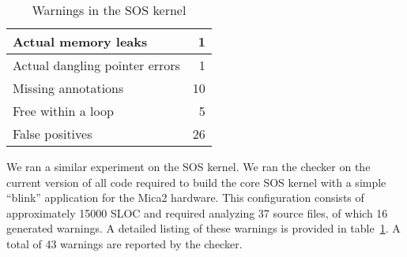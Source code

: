 \begin{table}
\caption{Warnings in the SOS kernel}
%
\label{tab:kernel}
\centering 
\begin{tabular}{| l | r |}
    \hline 
    Actual memory leaks & 1 \\
    \hline 
    Actual dangling pointer errors & 1 \\
    \hline
    Missing annotations & 10 \\
    \hline 
    Free within a loop & 5 \\
    \hline 
    False positives & 26 \\
    \hline 
\end{tabular} 
%
\end{table}

We ran a similar experiment on the SOS kernel.
We ran the checker on the current version of all code required to
build the core SOS kernel with a simple ``blink'' application for the
Mica2 hardware.  This configuration consists of approximately 15000 SLOC and
required analyzing 37 source files, of which 16
generated warnings.
A detailed listing of these warnings is
provided in table~\ref{tab:kernel}.
%
A total of 43 warnings are reported by the checker.

